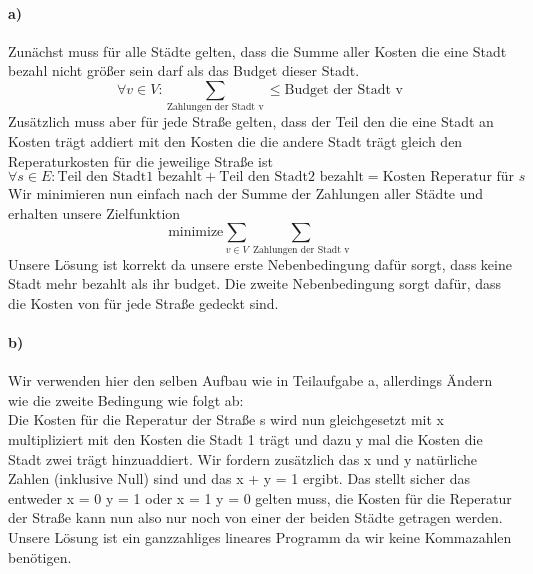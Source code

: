 \documentclass[a4paper]{article}
\begin{document}
\paragraph{a)}
Zunächst muss für alle Städte gelten, dass die Summe aller Kosten die eine 
Stadt bezahl nicht größer sein darf als das Budget dieser Stadt. 
\[
    \forall v \in V: \sum_{\text{Zahlungen der Stadt v}}
    \leq \text{Budget der Stadt v}    
\]
Zusätzlich muss aber für jede Straße gelten, dass der Teil den die eine 
Stadt an Kosten trägt addiert mit den Kosten die die andere Stadt trägt 
gleich den Reperaturkosten für die jeweilige Straße ist
\[
    \forall s \in E : \text{Teil den Stadt1 bezahlt} + 
    \text{Teil den Stadt2 bezahlt} = \text{Kosten Reperatur für $s$}
\]
Wir minimieren nun einfach nach der Summe der Zahlungen aller Städte
und erhalten unsere Zielfunktion
\[
    \text{minimize} \sum_{v \in V} \sum_{\text{Zahlungen der Stadt v}}
\]
Unsere Lösung ist korrekt da unsere erste Nebenbedingung dafür sorgt, 
dass keine Stadt mehr bezahlt als ihr budget. Die zweite Nebenbedingung
sorgt dafür, dass die Kosten von für jede Straße gedeckt sind.
\paragraph{b)}
Wir verwenden hier den selben Aufbau wie in Teilaufgabe a, allerdings 
Ändern wie die zweite Bedingung wie folgt ab: \\
Die Kosten für die Reperatur der Straße s wird nun gleichgesetzt mit  
x multipliziert mit den Kosten die Stadt 1 trägt und dazu y mal die Kosten
die Stadt zwei trägt hinzuaddiert. Wir fordern zusätzlich das x und y
natürliche Zahlen (inklusive Null) sind und das x + y = 1 ergibt. 
Das stellt sicher das entweder x = 0 y = 1 oder x = 1 y = 0 gelten muss,
die Kosten für die Reperatur der Straße kann nun also nur noch von 
einer der beiden Städte getragen werden. \\
Unsere Lösung ist ein ganzzahliges lineares Programm da wir keine 
Kommazahlen benötigen. 
\end{document}
